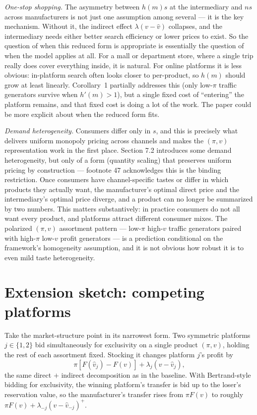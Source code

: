 \documentclass[11pt]{article}
\begin{document}
\textit{One-stop shopping.} The asymmetry between $h(m)s$ at the intermediary and $ns$ across manufacturers is not just one assumption among several --- it is the key mechanism. Without it, the indirect effect $\lambda(v-\hat{v})$ collapses, and the intermediary needs either better search efficiency or lower prices to exist. So the question of when this reduced form is appropriate is essentially the question of when the model applies at all. For a mall or department store, where a single trip really does cover everything inside, it is natural. For online platforms it is less obvious: in-platform search often looks closer to per-product, so $h(m)$ should grow at least linearly. Corollary~1 partially addresses this (only low-$\pi$ traffic generators survive when $h'(m)>1$), but a single fixed cost of ``entering'' the platform remains, and that fixed cost is doing a lot of the work. The paper could be more explicit about when the reduced form fits.

\textit{Demand heterogeneity.} Consumers differ only in $s$, and this is precisely what delivers uniform monopoly pricing across channels and makes the $(\pi,v)$ representation work in the first place. Section 7.2 introduces some demand heterogeneity, but only of a form (quantity scaling) that preserves uniform pricing by construction --- footnote 47 acknowledges this is the binding restriction. Once consumers have channel-specific tastes or differ in which products they actually want, the manufacturer's optimal direct price and the intermediary's optimal price diverge, and a product can no longer be summarized by two numbers. This matters substantively: in practice consumers do not all want every product, and platforms attract different consumer mixes. The polarized $(\pi,v)$ assortment pattern --- low-$\pi$ high-$v$ traffic generators paired with high-$\pi$ low-$v$ profit generators --- is a prediction conditional on the framework's homogeneity assumption, and it is not obvious how robust it is to even mild taste heterogeneity.

\section{Extension sketch: competing platforms}
\label{Extension}
Take the market-structure point in its narrowest form. Two symmetric platforms $j\in\{1,2\}$ bid simultaneously for exclusivity on a single product $(\pi,v)$, holding the rest of each assortment fixed. Stocking it changes platform $j$'s profit by
\[
\pi[F(\hat{v}_j)-F(v)] + \lambda_j(v-\hat{v}_j),
\]
the same direct $+$ indirect decomposition as in the baseline. With Bertrand-style bidding for exclusivity, the winning platform's transfer is bid up to the loser's reservation value, so the manufacturer's transfer rises from $\pi F(v)$ to roughly $\pi F(v) + \lambda_{-j}(v-\hat{v}_{-j})^+$.
\end{document}
